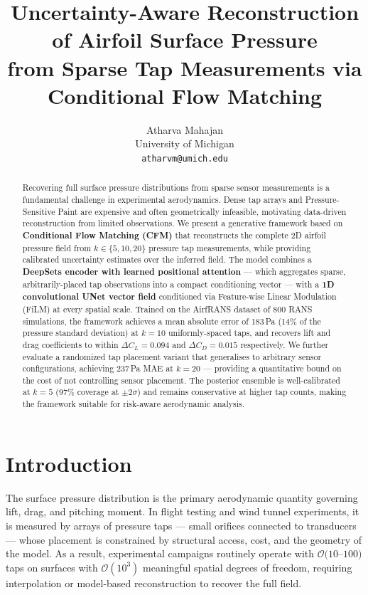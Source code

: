 \documentclass[12pt]{article}
\title{Uncertainty-Aware Reconstruction of Airfoil Surface Pressure\\
       from Sparse Tap Measurements via Conditional Flow Matching}
\author{Atharva Mahajan \\
        University of Michigan \\
        \texttt{atharvm@umich.edu}}
\begin{document}
\maketitle

\begin{abstract}
Recovering full surface pressure distributions from sparse sensor measurements
is a fundamental challenge in experimental aerodynamics. Dense tap arrays and
Pressure-Sensitive Paint are expensive and often geometrically infeasible,
motivating data-driven reconstruction from limited observations. We present a
generative framework based on \textbf{Conditional Flow Matching (CFM)} that
reconstructs the complete 2D airfoil pressure field from $k \in \{5, 10, 20\}$
pressure tap measurements, while providing calibrated uncertainty estimates over
the inferred field. The model combines a \textbf{DeepSets encoder with learned
positional attention} — which aggregates sparse, arbitrarily-placed tap
observations into a compact conditioning vector — with a \textbf{1D convolutional
UNet vector field} conditioned via Feature-wise Linear Modulation (FiLM) at
every spatial scale. Trained on the AirfRANS dataset of 800 RANS simulations,
the framework achieves a mean absolute error of 183\,Pa (14\% of the pressure
standard deviation) at $k=10$ uniformly-spaced taps, and recovers lift and drag
coefficients to within $\Delta C_L = 0.094$ and $\Delta C_D = 0.015$
respectively. We further evaluate a randomized tap placement variant that
generalises to arbitrary sensor configurations, achieving 237\,Pa MAE at
$k=20$ — providing a quantitative bound on the cost of not controlling sensor
placement. The posterior ensemble is well-calibrated at $k=5$ (97\% coverage
at $\pm2\sigma$) and remains conservative at higher tap counts, making the
framework suitable for risk-aware aerodynamic analysis.
\end{abstract}

\section{Introduction}
\label{sec:intro}

The surface pressure distribution is the primary aerodynamic quantity governing
lift, drag, and pitching moment. In flight testing and wind tunnel experiments,
it is measured by arrays of pressure taps — small orifices connected to
transducers — whose placement is constrained by structural access, cost, and
the geometry of the model. As a result, experimental campaigns routinely operate
with $\mathcal{O}(10$--$100)$ taps on surfaces with $\mathcal{O}(10^3)$
meaningful spatial degrees of freedom, requiring interpolation or model-based
reconstruction to recover the full field.
\end{document}
